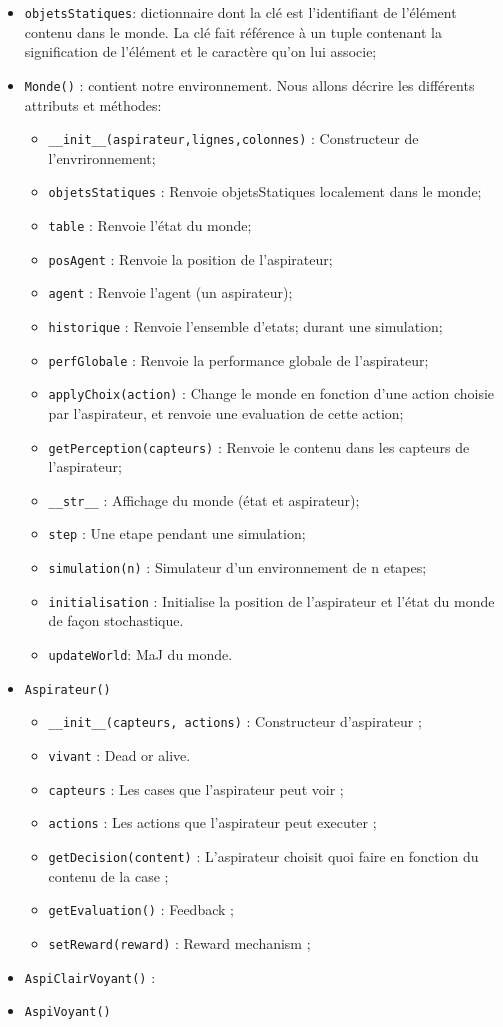 \documentclass[a4paper,10pt]{article}
\begin{document}
\begin{itemize}
 \item \texttt{objetsStatiques}: dictionnaire dont la clé est l'identifiant de l'élément contenu dans le monde. La clé fait référence à un tuple contenant la signification de l'élément et le caractère qu'on lui associe;
 \item \texttt{Monde()} : contient notre environnement. Nous allons décrire les différents attributs et méthodes:
  \begin{itemize}
  \item \texttt{\_\_init\_\_(aspirateur,lignes,colonnes)} : Constructeur de l'envrironnement;
  \item \texttt{objetsStatiques} : Renvoie objetsStatiques localement dans le monde;
  \item \texttt{table} : Renvoie l'état du monde;
  \item \texttt{posAgent} : Renvoie la position de l'aspirateur;
  \item \texttt{agent} : Renvoie l'agent (un aspirateur);
  \item \texttt{historique} : Renvoie l'ensemble d'etats; durant une simulation;
  \item \texttt{perfGlobale} : Renvoie la performance globale de l'aspirateur;
  \item \texttt{applyChoix(action)} : Change le monde en fonction d'une action choisie par l'aspirateur, et renvoie une evaluation de cette action; 
  \item \texttt{getPerception(capteurs)} : Renvoie le contenu dans les capteurs de l'aspirateur;
  \item \texttt{\_\_str\_\_} : Affichage du monde (état et aspirateur);
  \item \texttt{step} : Une etape pendant une simulation;
  \item \texttt{simulation(n)} : Simulateur d'un environnement de n etapes;
  \item \texttt{initialisation} : Initialise la position de l'aspirateur et l'état du monde de façon stochastique.
  \item \texttt{updateWorld}: MaJ du monde.
  \end{itemize}
 \item \texttt{Aspirateur()}
 \begin{itemize}
 \item \texttt{\_\_init\_\_(capteurs, actions)} : Constructeur d'aspirateur ; 
 \item \texttt{vivant} : Dead or alive.
 \item \texttt{capteurs} :  Les cases que l'aspirateur peut voir ;
 \item \texttt{actions} : Les actions que l'aspirateur peut executer ;
 \item \texttt{getDecision(content)} : L'aspirateur choisit quoi faire en fonction du contenu de la case ; 
 \item \texttt{getEvaluation()} : Feedback ; 
 \item \texttt{setReward(reward)} : Reward mechanism ; 
 \end{itemize}
 \item \texttt{AspiClairVoyant()} :
 \item \texttt{AspiVoyant()}
\end{itemize}
\end{document}
